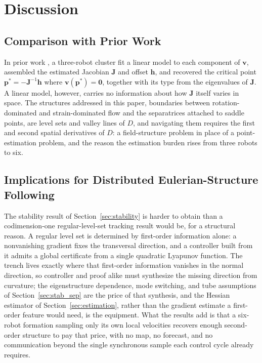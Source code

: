 \documentclass[lettersize,journal]{IEEEtran}
\begin{document}
\section{Discussion}
\label{sec:discussion}

\subsection{Comparison with Prior Work}
\label{sec:prior_comparison}

In prior work \cite{14}, a three-robot cluster fit a linear model to each
component of $\mathbf{v}$, assembled the estimated Jacobian
$\mathbf{J}$ and offset $\mathbf{h}$, and recovered the critical point
$\mathbf{p}^* = -\mathbf{J}^{-1}\mathbf{h}$ where $\mathbf{v}(\mathbf{p}^*) =
\mathbf{0}$, together with its type from the eigenvalues of $\mathbf{J}$.
A linear model, however, carries no information about how $\mathbf{J}$
itself varies in space. The structures addressed in this paper, boundaries
between rotation-dominated and strain-dominated flow and the separatrices
attached to saddle points, are level sets and valley lines of $D$, and
navigating them requires the first and second spatial derivatives of $D$:
a field-structure problem in place of a point-estimation problem, and the
reason the estimation burden rises from three robots to six.

\subsection{Implications for Distributed Eulerian-Structure Following}

The stability result of Section~\ref{sec:stability} is harder to
obtain than a codimension-one regular-level-set tracking result would
be, for a structural reason. A regular level set is determined by
first-order information alone: a nonvanishing gradient fixes the
transversal direction, and a controller built from it admits a global
certificate from a single quadratic Lyapunov function. The trench
lives exactly where that first-order information vanishes in the
normal direction, so controller and proof alike must synthesize the
missing direction from curvature; the eigenstructure dependence, mode
switching, and tube assumptions of Section~\ref{sec:stab_sep} are the
price of that synthesis, and the Hessian estimator of
Section~\ref{sec:estimation}, rather than the gradient estimate a
first-order feature would need, is the equipment. What the results add
is that a six-robot formation sampling only its own local velocities
recovers enough second-order structure to pay that price, with no map,
no forecast, and no communication beyond the single synchronous sample
each control cycle already requires.
\end{document}
